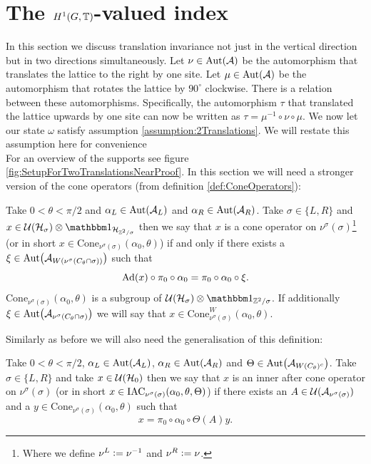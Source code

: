 \documentclass[12pt,a4paper,twoside]{article}
\numberwithin{equation}{section}
\begin{document}
\section{The $H^1(G,\mathbb T)$-valued index}\label{sec:TwoDirectionTraslationInvariance}
In this section we discuss translation invariance not just in the vertical direction but in two directions simultaneously. Let $\nu\in\Aut{\AA}$ be the automorphism that translates the lattice to the right by one site. Let $\mu\in\Aut{\AA}$ be the automorphism that rotates the lattice by $90^\circ$ clockwise. There is a relation between these automorphisms. Specifically, the automorphism $\tau$ that translated the lattice upwards by one site can now be written as $\tau=\mu^{-1}\circ\nu\circ\mu$. We now let our state $\omega$ satisfy assumption \ref{assumption:2Translations}. We will restate this assumption here for convenience
\assumptionTwo*$\:$\\
For an overview of the supports see figure \ref{fig:SetupForTwoTranslationsNearProof}. In this section we will need a stronger version of the cone operators (from definition \ref{def:ConeOperators}):
\begin{definition}
	Take $0<\theta<\pi/2$ and $\alpha_L\in\Aut{\AA_{L}}$ and $\alpha_R\in\Aut{\AA_{R}}$. Take $\sigma\in\{L,R\}$ and $x\in\UU(\HH_{\sigma})\otimes\id_{\HH_{\ZZ^2/\sigma}}$ then we say that $x$ is a cone operator on $\nu^\sigma(\sigma)$\footnote{Where we define $\nu^L\vcentcolon= \nu^{-1}$ and $\nu^R\vcentcolon= \nu$.} (or in short $x\in\textrm{Cone}_{\nu^\sigma(\sigma)}(\alpha_0,\theta)$) if and only if there exists a $\xi\in\Aut{\AA_{W(\nu^\sigma(C_\theta\cap\sigma))}}$ such that
	\begin{equation}
		\Ad{x}\circ\pi_0\circ\alpha_0=\pi_0\circ\alpha_0\circ\xi.
	\end{equation}
	$\textrm{Cone}_{\nu^\sigma(\sigma)}(\alpha_0,\theta)$ is a subgroup of $\UU(\HH_\sigma)\otimes\id_{\ZZ^2/\sigma}$. If additionally $\xi\in\Aut{\AA_{\nu^\sigma(C_\theta\cap\sigma)}}$ we will say that $x\in\textrm{Cone}_{\nu^\sigma(\sigma)}^W(\alpha_0,\theta)$.
\end{definition}
Similarly as before we will also need the generalisation of this definition:
\begin{definition}
	Take $0<\theta<\pi/2$, $\alpha_L\in\Aut{\AA_{L}}$, $\alpha_R\in\Aut{\AA_{R}}$ and $\Theta\in\Aut{\AA_{W(C_\theta)^c}}$. Take $\sigma\in\{L,R\}$ and take $x\in\mathcal U(\mathcal H_0)$ then we say that $x$ is an inner after cone operator on $\nu^\sigma(\sigma)$ (or in short $x\in \textrm{IAC}_{\nu^\sigma(\sigma)}(\alpha_0,\theta,\Theta)$) if there exists an $A\in\mathcal U(\mathcal A_{\nu^\sigma(\sigma)})$ and a $y\in\textrm{Cone}_{\nu^\sigma(\sigma)}(\alpha_0,\theta)$ such that
	\begin{equation}
		x=\pi_0\circ\alpha_0\circ\Theta(A)y.
	\end{equation}
\end{definition}
\end{document}
